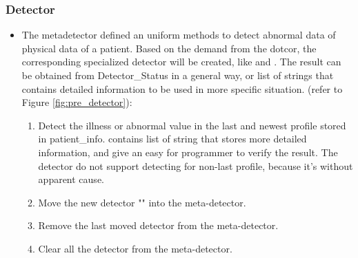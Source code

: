 \documentclass{article}
\begin{document}
\subsubsection*{Detector}
\begin{itemize}
    \item The metadetector defined an uniform methods to detect abnormal data of physical data of a patient. Based on the demand from the dotcor, the corresponding specialized detector will be created, like  and . The result can be obtained from Detector\_Status in a general way, or list of strings that contains detailed information to be used in more specific situation. (refer to Figure \ref{fig:pre_detector}):
    \begin{enumerate}[label=(\roman*)]
        \item {} Detect the illness or abnormal value in the last and newest profile stored in patient\_info.  contains list of string that stores more detailed information, and  give an easy for programmer to verify the result. The detector do not support detecting for non-last profile, because it's without apparent cause.
        \item {} Move the new detector "" into the meta-detector.
        \item {} Remove the last moved detector from the meta-detector.
        \item {} Clear all the detector from the meta-detector.
    \end{enumerate}
\end{itemize}
\end{document}
